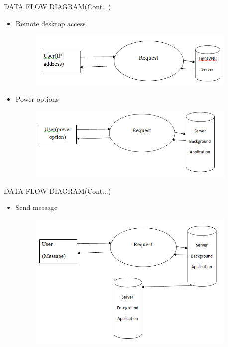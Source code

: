 \begin{frame}{DATA FLOW DIAGRAM(Cont...)}
   \begin{itemize}
  \item Remote desktop access
  \begin{figure}[ht!]
    \centering
    \includegraphics[width=10cm]{f3.png}
    \label{fig:pc control desk}
\end{figure}

  \item Power options
   
   \begin{figure}[ht!]
    \centering
    \includegraphics[width=10cm]{power1.png}    
    \label{fig:pc control power}
\end{figure}
\end{itemize}
 \end{frame}
 
 \begin{frame}{DATA FLOW DIAGRAM(Cont...)}
   \begin{itemize}
  \item Send message
  \begin{figure}[ht!]
    \centering
    \includegraphics[width=10cm]{send1.png}   
    \label{fig:pc control send}
\end{figure}
\end{itemize}
\end{frame}

